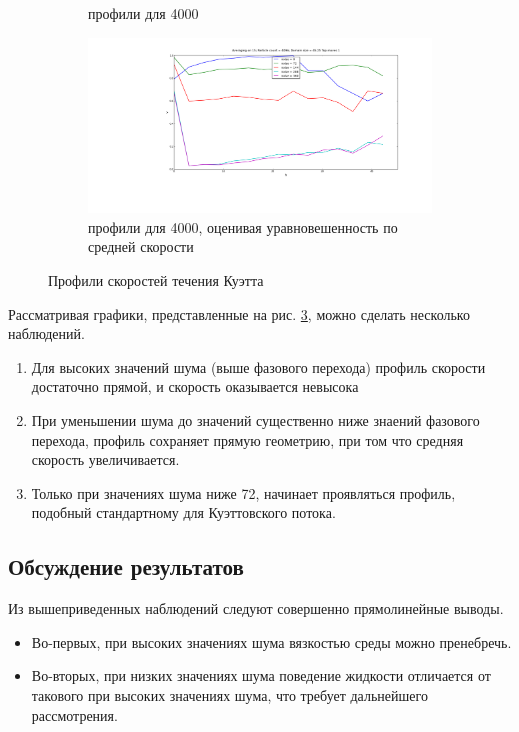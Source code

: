 \begin{figure}
\begin{subfigure}{0.45\textwidth}
                \caption{профили для 4000}
                \label{fig:Results:4kNew}
        \end{subfigure}
        \begin{subfigure}{0.45\textwidth}
                \includegraphics[width=\textwidth]{Images/4k_slices_oldAlg}
                \caption{профили для 4000, оценивая уравновешенность по средней скорости}
                \label{fig:Results:4kOld}
        \end{subfigure}
        \caption{Профили скоростей течения Куэтта}
        \label{fig:Results}
        \end{figure}

        Рассматривая графики, представленные на рис. \ref{fig:Results}, можно сделать несколько наблюдений.
        \begin{enumerate}
            \item Для высоких значений шума (выше фазового перехода) профиль скорости достаточно прямой, и скорость оказывается невысока
            \item При уменьшении шума до значений существенно ниже знаений фазового перехода, профиль сохраняет прямую геометрию, при том что средняя скорость увеличивается.
            \item Только при значениях шума ниже 72, начинает проявляться профиль, подобный стандартному для Куэттовского потока.
        \end{enumerate}

    \subsection{Обсуждение результатов} %
    \label{sub:Discussion}
        Из вышеприведенных наблюдений следуют совершенно прямолинейные выводы.
        \begin{itemize}
            \item Во-первых, при высоких значениях шума вязкостью среды можно пренебречь.
            \item Во-вторых, при низких значениях шума поведение жидкости отличается от такового при высоких значениях шума, что требует дальнейшего рассмотрения. 
        \end{itemize}

